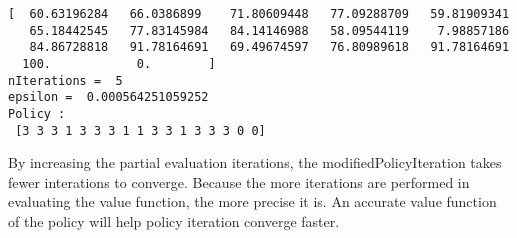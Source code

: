 \documentclass[11pt]{article}
\begin{document}
    \begin{Verbatim}[commandchars=\\\{\}]
[  60.63196284   66.0386899    71.80609448   77.09288709   59.81909341
   65.18442545   77.83145984   84.14146988   58.09544119    7.98857186
   84.86728818   91.78164691   69.49674597   76.80989618   91.78164691
  100.            0.        ]
nIterations =  5
epsilon =  0.000564251059252
Policy : 
 [3 3 3 1 3 3 3 1 1 3 3 1 3 3 3 0 0]

    \end{Verbatim}

    By increasing the partial evaluation iterations, the
modifiedPolicyIteration takes fewer interations to converge. Because the
more iterations are performed in evaluating the value function, the more
precise it is. An accurate value function of the policy will help policy
iteration converge faster.


    
    
    
    
\end{document}

